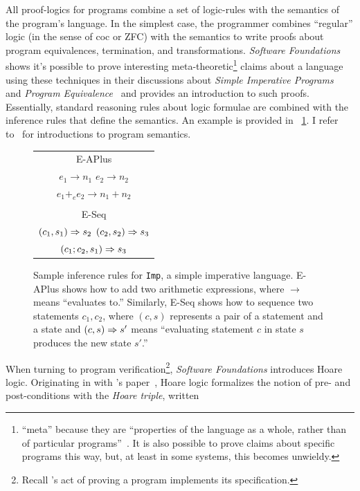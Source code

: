 All proof-logics for programs combine a set of logic-rules with the semantics of
the program's language. In the simplest case, the programmer combines
``regular'' logic (in the sense of \gls{coc} or ZFC) with the semantics to write
proofs about program equivalences, termination, and transformations.
\emph{Software Foundations} shows it's possible to prove interesting
meta-theoretic\footnote{``meta'' because they are ``properties of the language
as a whole, rather than of particular programs''~\cite{Pierce:SF2}. It is also
possible to prove claims about specific programs this way, but, at least in some
systems, this becomes unwieldy.} claims about a language using these techniques
in their discussions about \emph{Simple Imperative Programs}~\cite{Pierce:SF1}
and \emph{Program Equivalence}~\cite{Pierce:SF2} and provides an introduction to
such proofs. Essentially, standard reasoning rules about logic formulae are
combined with the inference rules that define the semantics. An example is
provided in \figurename~\ref{F:Imp_ex}. I refer
to~\cite{Winskel_1993,Harper_2016} for introductions to program semantics.

\begin{figure}
    \centering
    \begin{tabular}{c}
        E-APlus \\
        \(e_1 \to n_1\) \quad \(e_2 \to n_2\) \\
        \midrule
        \(e_1 +_e e_2 \to n_1 + n_2\) \\

        \\

        E-Seq \\
        \((c_1, s_1) \mathrel{\Rightarrow} s_2\) \quad \((c_2, s_2) \mathrel{\Rightarrow} s_3\) \\
        \midrule
        \((c_1;c_2, s_1) \mathrel{\Rightarrow} s_3\)
    \end{tabular}
    \caption{Sample inference rules for \texttt{Imp}, a simple imperative
    language. E-APlus shows how to add two arithmetic expressions, where \(\to\)
    means ``evaluates to.'' Similarly, E-Seq shows how to sequence two
    statements \(c_1, c_2\), where \((c, s)\) represents a pair of a statement
    and a state and \((c, s) \mathrel{\Rightarrow} s'\) means ``evaluating statement \(c\) in
    state \(s\) produces the new state \(s'\).''}\label{F:Imp_ex}
\end{figure}

When turning to program verification\footnote{Recall \citeauthor{EWD:EWD1036}'s
act of proving a program implements its specification.}, \emph{Software
Foundations} introduces Hoare logic. Originating in \citeyear{Hoare_1969} with
\citeauthor{Hoare_1969}'s paper~\cite{Hoare_1969}, Hoare logic formalizes the
notion of pre- and post-conditions with the \emph{Hoare triple}, written

